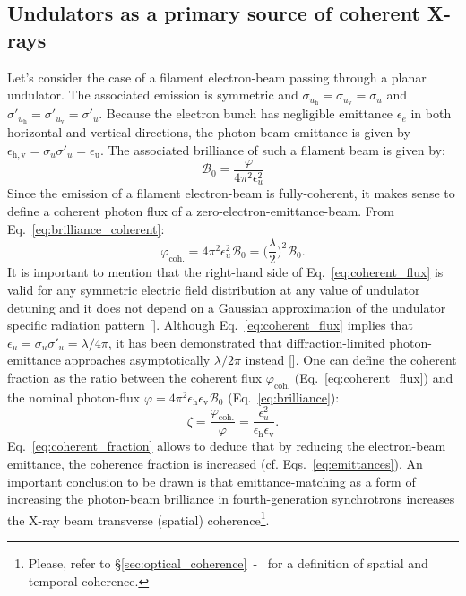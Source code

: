 \begin{refsection}
\subsection{Undulators as a primary source of coherent X-rays}\label{sec:undulators}

 Let's consider the case of a filament electron-beam passing through a planar undulator. The associated emission is symmetric and $\sigma_{u_{\mathrm{h}}}=\sigma_{u_{\mathrm{v}}}=\sigma_{u}$ and $\sigma'_{u_{\mathrm{h}}}=\sigma'_{u_{\mathrm{v}}}=\sigma'_{u}$. Because the electron bunch has negligible emittance $\epsilon_e$ in both horizontal and vertical directions, the photon-beam emittance is given by $\epsilon_\mathrm{h,v}=\sigma_{u}\sigma'_u=\epsilon_\mathrm{u}$. The associated brilliance of such a filament beam is given by:
\begin{equation}\label{eq:brilliance_coherent}
\mathcal{B}_0 = \frac{\varphi}{4\pi^2\epsilon^2_{u}}
\end{equation}{}
Since the emission of a filament electron-beam is fully-coherent, it makes sense to define a coherent photon flux of a zero-electron-emittance-beam. From Eq.~\ref{eq:brilliance_coherent}:
\begin{equation}\label{eq:coherent_flux}
\varphi_\mathrm{coh.} = 4\pi^2\epsilon^2_{u}\mathcal{B}_0=\Bigg(\frac{\lambda}{2}\Bigg)^2\mathcal{B}_0.
\end{equation}{}
It is important to mention that the right-hand side of Eq.~\ref{eq:coherent_flux} is valid for any symmetric electric field distribution at any value of undulator detuning and it does not depend on a Gaussian approximation of the undulator specific radiation pattern [\cite{Walker2019}]. Although Eq.~\ref{eq:coherent_flux} implies that $\epsilon_u = \sigma_u\sigma'_u =\lambda/4\pi$, it has been demonstrated that diffraction-limited photon-emittance approaches asymptotically $\lambda/2\pi$ instead [\cite{Khubbutdinov2019}]. One can define the coherent fraction as the ratio between the coherent flux $\varphi_\mathrm{coh.}$ (Eq.~\ref{eq:coherent_flux}) and the nominal photon-flux $\varphi = 4\pi^2\epsilon_\mathrm{h}\epsilon_\mathrm{v}\mathcal{B}_0$ (Eq.~\ref{eq:brilliance}):
\begin{equation}\label{eq:coherent_fraction}
\zeta =  \frac{\varphi_\mathrm{coh.}}{\varphi}=\frac{\epsilon^2_{u}}{\epsilon_\mathrm{h}\epsilon_\mathrm{v}}.
\end{equation}{}
Eq.~\ref{eq:coherent_fraction} allows to deduce that by reducing the electron-beam emittance, the coherence fraction is increased (cf. Eqs.~\ref{eq:emittances}). An important conclusion to be drawn is that emittance-matching as a form of increasing the photon-beam brilliance in fourth-generation synchrotrons increases the X-ray beam transverse (spatial) coherence\footnote{Please, refer to §\ref{sec:optical_coherence}~-~\textit{} for a definition of spatial and temporal coherence.\label{note:coherence}}.


\end{refsection}
